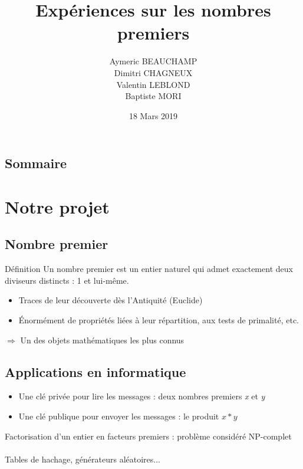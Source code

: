 \documentclass{beamer}
\title{Expériences sur les nombres premiers}
\author{Aymeric BEAUCHAMP\\Dimitri CHAGNEUX\\Valentin LEBLOND\\Baptiste MORI}
\date{18 Mars 2019}
\begin{document}
\maketitle
\section*{}
\subsection*{Sommaire}
\frame{\tableofcontents}

\section{Notre projet}

\subsection{Nombre premier}%
\begin{frame}
\begin{block}{Définition}
Un nombre premier est un entier naturel qui admet exactement deux diviseurs distincts : 1 et lui-même.
\end{block}
\begin{itemize}
\item Traces de leur découverte dès l'Antiquité (Euclide)
\item Énormément de propriétés liées à leur répartition, aux tests de primalité, etc.
\end{itemize}
$\Rightarrow$ Un des objets mathématiques les plus connus 
\end{frame}

\subsection{Applications en informatique}%
\begin{frame}
\begin{itemize}
\item Une clé privée pour lire les messages : deux nombres premiers \textit{x} et \textit{y}
\item Une clé publique pour envoyer les messages : le produit $x*y$
\end{itemize}
Factorisation d'un entier en facteurs premiers : problème considéré NP-complet\\
\vspace{0.5cm}
\\
\vspace{0.25cm}
Tables de hachage, générateurs aléatoires...
\end{frame}
\end{document}
